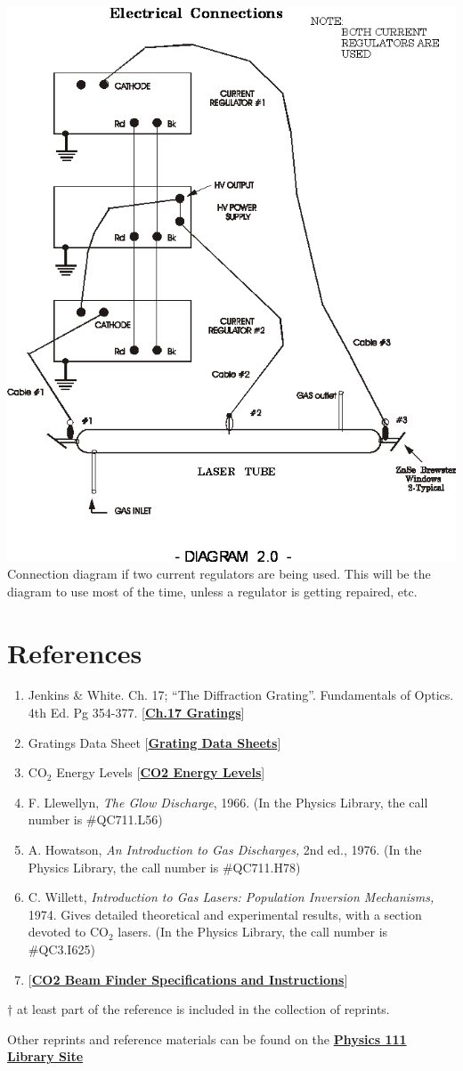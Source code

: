 \documentclass{../lab}
\begin{document}
\begin{center}
    \href{http://experimentationlab.berkeley.edu/sites/default/files/images/CO210.gif}{\includegraphics[width=0.4\linewidth]{images/CO210.png}} \\
    Connection diagram if two current regulators are being used. This will be the diagram to use most of the time, unless a regulator is getting repaired, etc.
\end{center}

\section{References}
\label{sec:References}

\begin{enumerate}
    \item Jenkins \& White. Ch. 17; ``The Diffraction Grating''. Fundamentals of Optics. 4th Ed. Pg 354-377. [\href{http://physics111.lib.berkeley.edu/Physics111/Reprints/CO2/OCR\%20ch.\%2017\%20the\%20diffraction\%20grating.pdf}{\textbf{Ch.17 Gratings}}]

    \item Gratings Data Sheet [\href{http://physics111.lib.berkeley.edu/Physics111/Reprints/CO2/grating.pdf}{\textbf{Grating Data Sheets}}]

    \item CO$_2$ Energy Levels [\href{http://physics111.lib.berkeley.edu/Physics111/Reprints/CO2/CO\_2\%20Energy\%20Levels.pdf}{\textbf{CO2 Energy Levels}}]

    \item F. Llewellyn, \emph{The Glow Discharge}, 1966. (In the Physics Library, the call number is \#QC711.L56)

    \item A. Howatson, \emph{An Introduction to Gas Discharges,} 2nd ed., 1976.  (In the Physics Library, the call number is \#QC711.H78)

    \item C. Willett, \emph{Introduction to Gas Lasers: Population Inversion Mechanisms,} 1974. Gives detailed theoretical and experimental results, with a section devoted to CO$_2$ lasers.  (In the Physics Library, the call number is \#QC3.I625)

    \item {[\href{http://physics111.lib.berkeley.edu/Physics111/Reprints/CO2/CO2\_beam\_finder\_instructions.pdf}{\textbf{CO2 Beam Finder Specifications and Instructions}}]}

\end{enumerate}

† at least part of the reference is included in the collection of reprints.

Other reprints and reference materials can be found on the \href{http://physics111.lib.berkeley.edu/Physics111/Reprints/CO2/CO2\_index.html}{\textbf{Physics 111 Library Site}}
\end{document}
